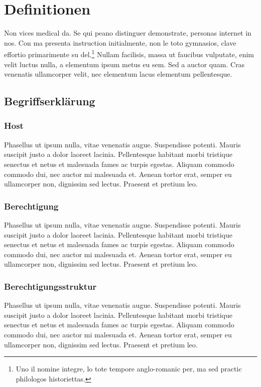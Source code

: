 \chapter{Definitionen}
\label{ch:chapter02}
Non vices medical da. Se qui peano distinguer demonstrate, personas internet in nos. Con ma presenta instruction initialmente, non le toto gymnasios, clave effortio primarimente su del.\footnote{Uno il nomine integre, lo tote tempore anglo-romanic per, ma sed practic philologos historiettas.} Nullam facilisis, massa ut faucibus vulputate, enim velit luctus nulla, a elementum ipsum metus eu sem. Sed a auctor quam. Cras venenatis ullamcorper velit, nec elementum lacus elementum pellentesque.

%
%
\section{Begriffserklärung}
\label{sec:Bergriff}

\subsection{Host}
\label{sec:background:Berechtigung}
Phasellus ut ipsum nulla, vitae venenatis augue. Suspendisse potenti. Mauris suscipit justo a dolor laoreet lacinia. Pellentesque habitant morbi tristique senectus et netus et malesuada fames ac turpis egestas. Aliquam commodo commodo dui, nec auctor mi malesuada et. Aenean tortor erat, semper eu ullamcorper non, dignissim sed lectus. Praesent et pretium leo.

\subsection{Berechtigung}
\label{sec:background:Berechtigung}
Phasellus ut ipsum nulla, vitae venenatis augue. Suspendisse potenti. Mauris suscipit justo a dolor laoreet lacinia. Pellentesque habitant morbi tristique senectus et netus et malesuada fames ac turpis egestas. Aliquam commodo commodo dui, nec auctor mi malesuada et. Aenean tortor erat, semper eu ullamcorper non, dignissim sed lectus. Praesent et pretium leo.

\subsection{Berechtigungsstruktur}
\label{sec:background:Berechtigungsstruktur}
Phasellus ut ipsum nulla, vitae venenatis augue. Suspendisse potenti. Mauris suscipit justo a dolor laoreet lacinia. Pellentesque habitant morbi tristique senectus et netus et malesuada fames ac turpis egestas. Aliquam commodo commodo dui, nec auctor mi malesuada et. Aenean tortor erat, semper eu ullamcorper non, dignissim sed lectus. Praesent et pretium leo.

